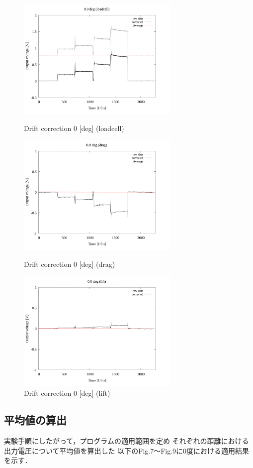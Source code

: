 \documentclass[twocolumn,a4j]{jsarticle}
\begin{document}
\begin{figure}[htbp]
    \footnotesize
    \begin{center}
        \includegraphics[width=78mm]{../images_2/02-1_loadcell/02_loadcell-drift_0.png}
        \caption{Drift correction 0 [deg] (loadcell)}
        \includegraphics[width=78mm]{../images_2/02-2_drag/02_drag-drift_0.png}
        \caption{Drift correction 0 [deg] (drag)}
        \includegraphics[width=78mm]{../images_2/02-3_lift/02_lift-drift_0.png}
        \caption{Drift correction 0 [deg] (lift)}
    \end{center}
\end{figure}

\newpage

\subsection{平均値の算出}
実験手順にしたがって，プログラムの適用範囲を定め
それぞれの距離における出力電圧について平均値を算出した
以下のFig.7～Fig.9に0度における適用結果を示す．
\end{document}
